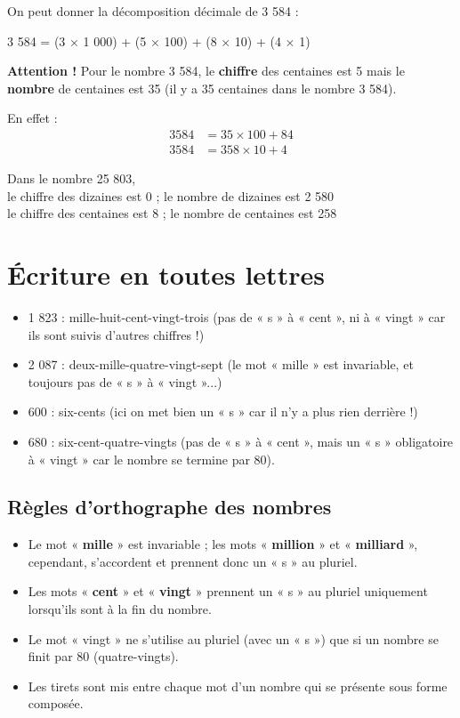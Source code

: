 On peut donner la décomposition décimale de 3 584 :

\begin{examplebox}
	3 584 = (3 × 1 000) + (5 × 100) + (8 × 10) + (4 × 1)
\end{examplebox}

\textbf{Attention !} Pour le nombre 3 584, le \textbf{chiffre} des centaines est 5 mais le \textbf{nombre} de centaines est 35 (il y a 35 centaines dans le nombre 3 584).

En effet :
\begin{align*}
	3 584 &= 35 \times 100 + 84\\
	3 584 &= 358 \times 10 + 4
\end{align*}

\begin{examplebox}
	Dans le nombre 25 803,\\ 
	le chiffre des dizaines est 0 ; le nombre de dizaines est 2 580\\
	le chiffre des centaines est 8 ; le nombre de centaines est 258
\end{examplebox}

\section{Écriture en toutes lettres}

\begin{examplebox}
	\begin{itemize}[label = \textbullet]
		\item 1 823 : mille-huit-cent-vingt-trois (pas de « s » à « cent », ni à « vingt » car ils sont suivis d'autres chiffres !)
		\item 2 087 : deux-mille-quatre-vingt-sept (le mot « mille » est invariable, et toujours pas de « s » à « vingt »...)
		\item 600 : six-cents (ici on met bien un « s » car il n'y a plus rien derrière !)
		\item 680 : six-cent-quatre-vingts (pas de « s » à « cent », mais un « s » obligatoire à « vingt » car le nombre se termine par 80).
	\end{itemize}
\end{examplebox}

\subsection{Règles d'orthographe des nombres}

\begin{itemize}
	\item Le mot « \textbf{mille} » est invariable ; les mots « \textbf{million} » et « \textbf{milliard} », cependant, s'accordent et prennent donc un « s » au pluriel.
	\item Les mots « \textbf{cent} » et « \textbf{vingt} » prennent un « s » au pluriel uniquement lorsqu'ils sont à la fin du nombre.
	\item Le mot « vingt » ne s'utilise au pluriel (avec un « s ») que si un nombre se finit par 80 (quatre-vingts).
	\item Les tirets sont mis entre chaque mot d'un nombre qui se présente sous forme composée.
\end{itemize}

